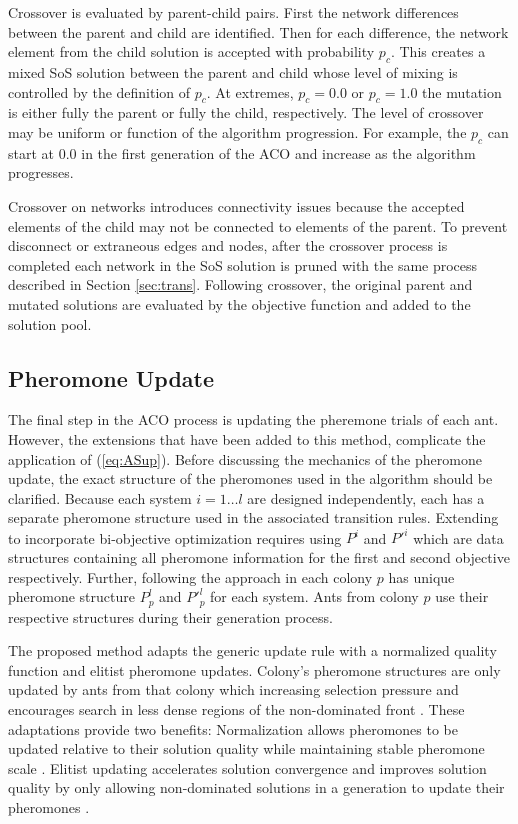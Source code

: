 \documentclass[preprint,12pt]{elsarticle}
\begin{document}
Crossover is evaluated by parent-child pairs. First the network differences between the parent and child are identified. Then for each difference, the network element from the child solution is accepted with probability $p_c$. This creates a mixed SoS solution between the parent and child whose level of mixing is controlled by the definition of $p_c$. At extremes, $p_c=0.0$ or $p_c=1.0$ the mutation is either fully the parent or fully the child, respectively. The level of crossover may be uniform or function of the algorithm progression. For example, the $p_c$ can start at $0.0$ in the first generation of the ACO and increase as the algorithm progresses.

Crossover on networks introduces connectivity issues because the accepted elements of the child may not be connected to elements of the parent. To prevent disconnect or extraneous edges and nodes, after the crossover process is completed each network in the SoS solution is pruned with the same process described in Section \ref{sec:trans}. Following crossover, the original parent and mutated solutions are evaluated by the objective function and added to the solution pool.


\subsection{Pheromone Update}
The final step in the ACO process is updating the pheremone trials of each ant. However, the extensions that have been added to this method, complicate the application of (\ref{eq:ASup}). Before discussing the mechanics of the pheromone update, the exact structure of the pheromones used in the algorithm should be clarified. Because each system $i=1\ldots l$ are designed independently, each has a separate pheromone structure used in the associated transition rules. Extending to incorporate bi-objective optimization requires using $P^i$ and $P'^{i}$ which are data structures containing all pheromone information for the first and second objective respectively. Further, following the approach in \cite{Iredi2001} each colony $p$ has unique pheromone structure $P^l_p$ and $P'^{l}_p$ for each system. Ants from colony $p$ use their respective structures during their generation process.  

The proposed method adapts the generic update rule with a normalized quality function and elitist pheromone updates. Colony's pheromone structures are only updated by ants from that colony which increasing selection pressure and encourages search in less dense regions of the non-dominated front \citep{Iredi2001}. These adaptations provide two benefits: Normalization allows pheromones to be updated relative to their solution quality while maintaining stable pheromone scale \citep{Blum2004}. Elitist updating accelerates solution convergence and improves solution quality by only allowing non-dominated solutions in a generation to update their pheromones \citep{Iredi2001}. 
\end{document}

